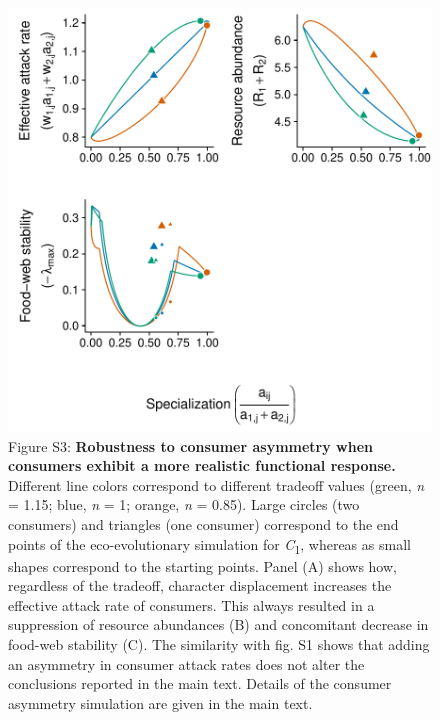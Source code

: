 \documentclass[11pt,]{article}
\begin{document}
\begin{figure}
\centering
\includegraphics{Figure_ECD_McCann_asymm.pdf}
\caption{Figure S3: \textbf{Robustness to consumer asymmetry when
consumers exhibit a more realistic functional response.} Different line
colors correspond to different tradeoff values (green, \emph{n} = 1.15;
blue, \emph{n} = 1; orange, \emph{n} = 0.85). Large circles (two
consumers) and triangles (one consumer) correspond to the end points of
the eco-evolutionary simulation for \emph{C}\textsubscript{1}, whereas
as small shapes correspond to the starting points. Panel (A) shows how,
regardless of the tradeoff, character displacement increases the
effective attack rate of consumers. This always resulted in a
suppression of resource abundances (B) and concomitant decrease in
food-web stability (C). The similarity with fig. S1 shows that adding an
asymmetry in consumer attack rates does not alter the conclusions
reported in the main text. Details of the consumer asymmetry simulation
are given in the main text.}
\end{figure}


\end{document}
